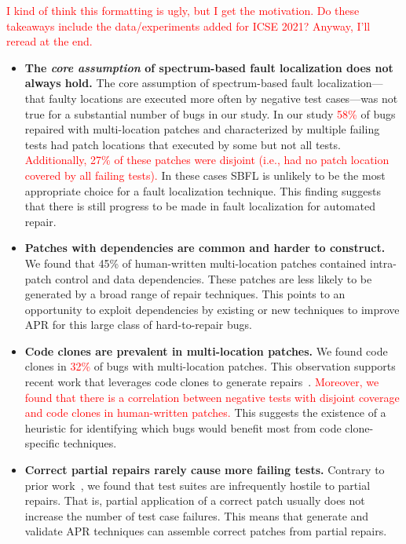 \documentclass[10pt, conference]{IEEEtran}
\newcommand\todo[1]{\textcolor{red}{#1}}
\begin{document}
\todo{I kind of think this formatting is ugly, but I get the motivation.  Do
  these takeaways include the data/experiments added for ICSE 2021?  Anyway,
  I'll reread at the end.}
\begin{itemize}[wide, labelindent=0pt]
\item \textbf{The \emph{core assumption} of spectrum-based fault
  localization does not always hold.}
The core assumption of spectrum-based fault localization---that faulty locations
are executed more often by negative test cases---was not true for a substantial
number of bugs in our study. In our study \todo{58\%} of bugs repaired with
multi-location patches and characterized by multiple failing tests had patch
locations that executed by some but not all tests. \todo{Additionally, \todo{27\%} of
these patches were disjoint (i.e., had no patch location covered by all failing
tests).}  In these cases SBFL is unlikely to be the most appropriate choice for a
fault localization technique. This finding suggests that there is still progress
to be made in fault localization for automated repair.

\item \textbf{Patches with dependencies are common and harder to construct.}
We found that 45\% of human-written multi-location patches contained
intra-patch control and data dependencies. These patches are less likely to be
generated by a broad range of repair techniques. 
This points to an opportunity to exploit dependencies by
existing or new techniques to improve APR for this large class of hard-to-repair
bugs.

\item\textbf{Code clones are prevalent in multi-location patches.}
We found code clones in \todo{32\%} of bugs with multi-location
patches. This observation supports recent work that leverages code clones to
generate repairs~\cite{saha2019harnessing}. \todo{Moreover, we found that there is a
correlation between negative tests with disjoint coverage and code clones in
human-written patches.} This suggests the existence of a heuristic for
identifying which bugs would benefit most from code clone-specific techniques.

\item\textbf{Correct partial repairs rarely cause more failing tests.}
Contrary to prior work~\cite{gecco09}, we found that test suites are infrequently
hostile to partial repairs. That is, partial application of a correct patch
usually does not increase the number of test case failures. This means that
generate and validate APR techniques can assemble correct patches from partial repairs.


\end{itemize}
\end{document}
